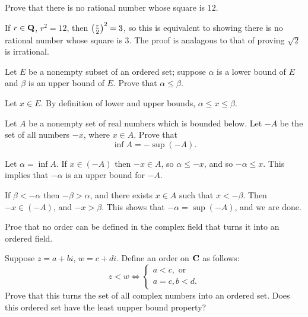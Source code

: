 \begin{prbm}
Prove that there is no rational number whose square is $12$.
\end{prbm}

\begin{solution}
If $r\in\mathbf Q$, $r^2=12$, then $\left(\frac{r}{2}\right)^2=3$, so this is equivalent to showing there is no rational number whose square is $3$. The proof is analagous to that of proving $\sqrt{2}$ is irrational.
\end{solution}

\begin{prbm}
Let $E$ be a nonempty subset of an ordered set; suppose $\alpha$ is a lower bound of $E$ and $\beta$ is an upper bound of $E$. Prove that $\alpha\le\beta$.
\end{prbm}

\begin{solution}
Let $x\in E$. By definition of lower and upper bounds, $\alpha\le x\le\beta$.
\end{solution}

\begin{prbm}
Let $A$ be a nonempty set of real numbers which is bounded below. Let $-A$ be the set of all numbers $-x$, where $x\in A$. Prove that
\[\inf A=-\sup(-A).\]
\end{prbm}

\begin{solution}
Let $\alpha=\inf A$. If $x\in(-A)$ then $-x\in A$, so $\alpha\le-x$, and so $-\alpha\le x$. This implies that $-\alpha$ is an upper bound for $-A$.

If $\beta<-\alpha$ then $-\beta>\alpha$, and there exists $x\in A$ such that $x<-\beta$. Then $-x\in(-A)$, and $-x>\beta$. This shows that $-\alpha=\sup(-A)$, and we are done.
\end{solution}

\begin{prbm}
Proe that no order can be defined in the complex field that turns it into an ordered field.
\end{prbm}

\begin{prbm}
Suppose $z=a+bi$, $w=c+di$. Define an order on $\mathbf C$ as follows:
\[z<w\iff\begin{cases}
a<c,\text{ or}\\
a=c,b<d.
\end{cases}\]
Prove that this turns the set of all complex numbers into an ordered set. Does this ordered set have the least uupper bound property?
\end{prbm}

